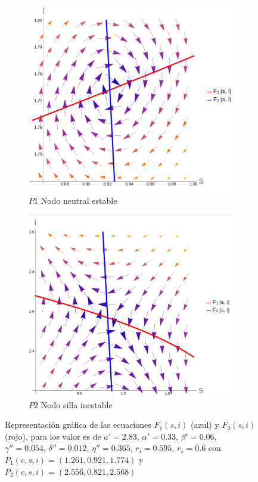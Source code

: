 \documentclass{article}
\begin{document}
\begin{figure}[h]
	\centering
	\begin{subfigure}{0.4\linewidth}
		\includegraphics[width=\linewidth]{images/nullclines_1.png}
		\caption{$P1$ Nodo neutral estable}
		\label{fig:subfigA}
	\end{subfigure}
        \hspace{0.2cm}
	\begin{subfigure}{0.4\linewidth}
		\includegraphics[width=\linewidth]{images/nullclines_2.png}
		\caption{$P2$ Nodo silla inestable}
		\label{fig:subfigB}
	\end{subfigure}
	\caption{Representación gráfica de las ecuaciones $F_1(s,i)$ (azul) y $F_2(s,i)$ (rojo), para los valor es de $a'=2.83$, $\alpha'=0.33$, $\beta'=0.06$, $\gamma''=0.054$, $\delta''=0.012$, $\eta''=0.365$, $r_i=0.595$, $r_s=0.6$ con $P_1(c,s,i)=(1.261, 0.921, 1.774)$ y $P_2(c,s,i)=(2.556, 0.821, 2.568)$ }
	\label{fig:nullclines}
\end{figure}
\end{document}
